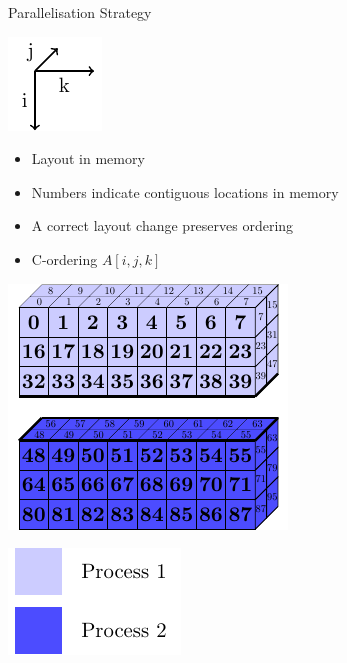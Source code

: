 \documentclass{beamer}
\begin{document}
\begin{frame}{Parallelisation Strategy}
\begin{minipage}{.4\textwidth}
\includegraphics[width=.4\textwidth]{SplitConcat3D/Axes}

  \begin{itemize}
   \item Layout in memory
   \item Numbers indicate contiguous locations in memory
   \item A correct layout change preserves ordering
   \item C-ordering $A[i,j,k]$
  \end{itemize}
  
 \end{minipage}
 \begin{minipage}{.55\textwidth}
 \centering
  \includegraphics[width=.7\textwidth]{SplitConcat3D/Layout1Distrib1_2}
  \vspace{1em}
  
  \hfill\includegraphics[width=.3\textwidth]{SplitConcat3D/Legend}
  \end{minipage}
\end{frame}
\end{document}
